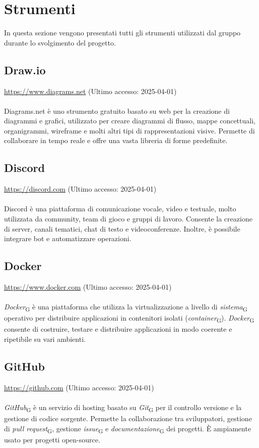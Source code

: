 \section{Strumenti}
In questa sezione vengono presentati tutti gli strumenti utilizzati dal gruppo durante lo svolgimento del progetto.

\subsection{Draw.io}
\label{Diagrams.net}
\href{https://www.diagrams.net}{https://www.diagrams.net} (Ultimo accesso: 2025-04-01) \\ \\  
Diagrams.net è uno strumento gratuito basato su web per la creazione di diagrammi e grafici, utilizzato per creare diagrammi di flusso, mappe concettuali, organigrammi, wireframe e molti altri tipi di rappresentazioni visive. Permette di collaborare in tempo reale e offre una vasta libreria di forme predefinite.

\subsection{Discord}
\label{Discord}
\href{https://discord.com}{https://discord.com} (Ultimo accesso: 2025-04-01) \\ \\  
Discord è una piattaforma di comunicazione vocale, video e testuale, molto utilizzata da community, team di gioco e gruppi di lavoro. Consente la creazione di server, canali tematici, chat di testo e videoconferenze. Inoltre, è possibile integrare bot e automatizzare operazioni.

\subsection{Docker}
\label{Docker}
\href{https://www.docker.com}{https://www.docker.com} (Ultimo accesso: 2025-04-01) \\ \\  
\textit{Docker}\textsubscript{G} è una piattaforma che utilizza la virtualizzazione a livello di \textit{sistema}\textsubscript{G} operativo per distribuire applicazioni in contenitori isolati (\textit{container}\textsubscript{G}). \textit{Docker}\textsubscript{G} consente di costruire, testare e distribuire applicazioni in modo coerente e ripetibile su vari ambienti.

\subsection{GitHub}
\label{GitHub}
\href{https://github.com}{https://github.com} (Ultimo accesso: 2025-04-01) \\ \\  
\textit{GitHub}\textsubscript{G} è un servizio di hosting basato su \textit{Git}\textsubscript{G} per il controllo versione e la gestione di codice sorgente. Permette la collaborazione tra sviluppatori, gestione di \textit{pull request}\textsubscript{G}, gestione \textit{issue}\textsubscript{G} e \textit{documentazione}\textsubscript{G} dei progetti. È ampiamente usato per progetti open-source.

